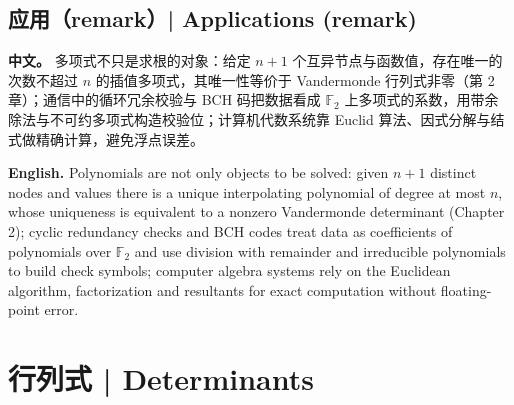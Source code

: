 \documentclass[UTF8,11pt,a4paper]{ctexart}
\newcommand{\APS}[2]{\par\noindent\textbf{中文。} #1\par\noindent\textbf{English.} #2\par\smallskip}
\begin{document}
\subsection{应用（remark）| Applications (remark)}
\APS{多项式不只是求根的对象：给定 $n+1$ 个互异节点与函数值，存在唯一的次数不超过 $n$ 的插值多项式，其唯一性等价于 Vandermonde 行列式非零（第 2 章）；通信中的循环冗余校验与 BCH 码把数据看成 $\mathbb F_2$ 上多项式的系数，用带余除法与不可约多项式构造校验位；计算机代数系统靠 Euclid 算法、因式分解与结式做精确计算，避免浮点误差。}{Polynomials are not only objects to be solved: given $n+1$ distinct nodes and values there is a unique interpolating polynomial of degree at most $n$, whose uniqueness is equivalent to a nonzero Vandermonde determinant (Chapter 2); cyclic redundancy checks and BCH codes treat data as coefficients of polynomials over $\mathbb F_2$ and use division with remainder and irreducible polynomials to build check symbols; computer algebra systems rely on the Euclidean algorithm, factorization and resultants for exact computation without floating-point error.}

\section{行列式 | Determinants}
\end{document}

